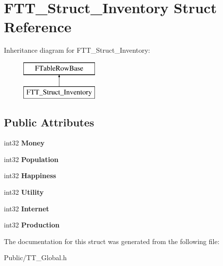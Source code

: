 \hypertarget{struct_f_t_t___struct___inventory}{}\section{F\+T\+T\+\_\+\+Struct\+\_\+\+Inventory Struct Reference}
\label{struct_f_t_t___struct___inventory}
Inheritance diagram for F\+T\+T\+\_\+\+Struct\+\_\+\+Inventory\+:\begin{figure}[H]
\begin{center}
\leavevmode
\includegraphics[height=2.000000cm]{struct_f_t_t___struct___inventory}
\end{center}
\end{figure}
\subsection*{Public Attributes}
\begin{DoxyCompactItemize}
\item 
\mbox{\label{struct_f_t_t___struct___inventory_a85672708a3437e32bcd7881acd52c59c}} 
int32 {\bfseries Money}
\item 
\mbox{\label{struct_f_t_t___struct___inventory_a017d76b10816f3c0e01a3a413bfcd7d2}} 
int32 {\bfseries Population}
\item 
\mbox{\label{struct_f_t_t___struct___inventory_a2acc1952b3dfb45f0124569c2598fcbd}} 
int32 {\bfseries Happiness}
\item 
\mbox{\label{struct_f_t_t___struct___inventory_a7154efe4628ae65ac95f7ff46780a51e}} 
int32 {\bfseries Utility}
\item 
\mbox{\label{struct_f_t_t___struct___inventory_a7cb523f647e73a2c2e89692bf56180e8}} 
int32 {\bfseries Internet}
\item 
\mbox{\label{struct_f_t_t___struct___inventory_a6459e6f100d7477a866a4f10a09608fc}} 
int32 {\bfseries Production}
\end{DoxyCompactItemize}


The documentation for this struct was generated from the following file\+:\begin{DoxyCompactItemize}
\item 
Public/T\+T\+\_\+\+Global.\+h\end{DoxyCompactItemize}
